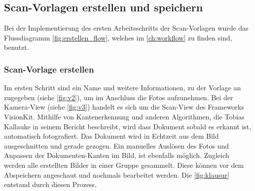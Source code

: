 \documentclass[notables, nomenclature, oneside, 150]{HSMW-Thesis}
\begin{document}
		\subsection{Scan-Vorlagen erstellen und speichern}
			Bei der Implementierung des ersten Arbeitsschritts der Scan-Vorlagen wurde das Flussdiagramm \ref{fig:erstellen_flow}, welches im \autoref{ch:workflow} zu finden sind, benutzt.
			
			\subsubsection*{Scan-Vorlage erstellen}
				Im ersten Schritt sind ein Name und weitere Informationen, zu der Vorlage an zugegeben (siehe \ref{fig:v2}), um im Anschluss die Fotos aufzunehmen. Bei der Kamera-View (siehe \ref{fig:v3}) handelt es sich um die Scan-View des Frameworks VisionKit. Mithilfe von Kantenerkennung und anderen Algorithmen, die Tobias Kallauke in seinem Bericht beschreibt, wird dass Dokument sobald es erkannt ist, automatisch fotografiert. Das Dokument wird in Echtzeit aus dem Bild ausgeschnitten und gerade gezogen. Ein manuelles Auslösen des Fotos und Anpassen der Dokumenten-Kanten im Bild, ist ebenfalls möglich. Zugleich werden alle erstellten Bilder in einer Gruppe gesammelt. Diese können vor dem Abspeichern angeschaut und nochmals bearbeitet werden. Die \autoref{fig:klausur} entstand durch diesen Prozess.
				
\end{document}
